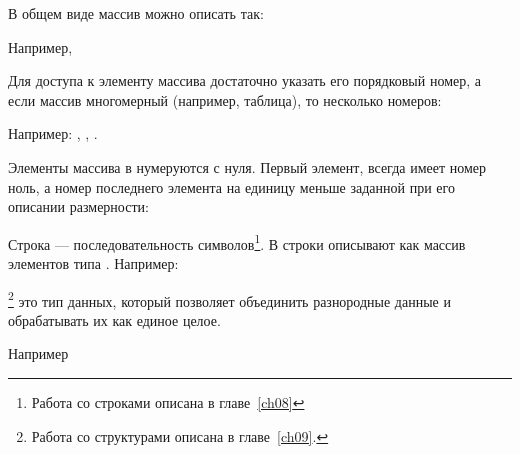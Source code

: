 В общем виде массив можно описать так:


Например,





Для доступа к элементу массива достаточно указать его порядковый номер, а если
массив многомерный (например, таблица), то несколько номеров:



Например: , , .

Элементы массива в  нумеруются с нуля. Первый элемент, всегда имеет 
номер ноль, а номер последнего элемента на
единицу меньше заданной при его описании размерности: 



Строка --- последовательность символов\footnote{Работа со строками описана в главе~\ref{ch08}}. В
 строки описывают как массив элементов типа . Например:


\footnote{Работа со структурами описана в главе~\ref{ch09}.} это тип данных,
который позволяет объединить разнородные данные и обрабатывать их как единое целое.

Например


\Sys{\{}




\Sys{\}}



